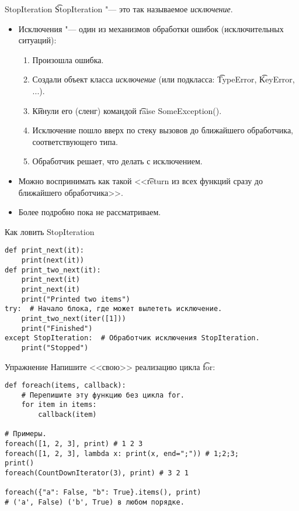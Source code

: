 \begin{frame}{StopIteration}
	\t{StopIteration} "--- это так называемое \textit{исключение}.

	\begin{itemize}
		\item Исключения "--- один из механизмов обработки ошибок (исключительных ситуаций):
			\begin{enumerate}
				\item Произошла ошибка.
				\item Создали объект класса \textit{исключение} (или подкласса: \t{TypeError}, \t{KeyError}, ...).
				\item \t{Кинули} его (сленг) командой \t{raise SomeException()}.
				\item Исключение пошло вверх по стеку вызовов до ближайшего обработчика, соответствующего типа.
				\item Обработчик решает, что делать с исключением.
			\end{enumerate}
		\item Можно воспринимать как такой <<\t{return} из всех функций сразу до ближайшего обработчика>>.
		\item Более подробно пока не рассматриваем.
	\end{itemize}
\end{frame}

\begin{frame}[fragile]{Как ловить StopIteration}
\begin{verbatim}
def print_next(it):
    print(next(it))
def print_two_next(it):
    print_next(it)
    print_next(it)
    print("Printed two items")
try:  # Начало блока, где может вылететь исключение.
    print_two_next(iter([1]))
    print("Finished")
except StopIteration:  # Обработчик исключения StopIteration.
    print("Stopped")
\end{verbatim}
\end{frame}

\begin{frame}[fragile]{Упражнение}
	Напишите <<свою>> реализацию цикла \t{for}:
\begin{verbatim}
def foreach(items, callback):
    # Перепишите эту функцию без цикла for.
    for item in items:
        callback(item)

# Примеры.
foreach([1, 2, 3], print) # 1 2 3
foreach([1, 2, 3], lambda x: print(x, end=";")) # 1;2;3;
print()
foreach(CountDownIterator(3), print) # 3 2 1

foreach({"a": False, "b": True}.items(), print)
# ('a', False) ('b', True) в любом порядке.
\end{verbatim}
\end{frame}
